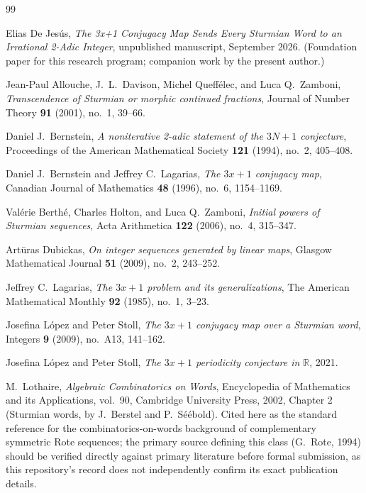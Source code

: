 \documentclass[11pt]{article}
\begin{document}
\begin{thebibliography}{99}

 Elias De Jesús, \emph{The 3x+1 Conjugacy Map Sends Every Sturmian Word to an Irrational 2-Adic Integer}, unpublished manuscript, September 2026. (Foundation paper for this research program; companion work by the present author.)

 Jean-Paul Allouche, J.\ L.\ Davison, Michel Queffélec, and Luca Q.\ Zamboni, \emph{Transcendence of Sturmian or morphic continued fractions}, Journal of Number Theory \textbf{91} (2001), no.\ 1, 39--66.

 Daniel J.\ Bernstein, \emph{A noniterative 2-adic statement of the $3N+1$ conjecture}, Proceedings of the American Mathematical Society \textbf{121} (1994), no.\ 2, 405--408.

 Daniel J.\ Bernstein and Jeffrey C.\ Lagarias, \emph{The $3x+1$ conjugacy map}, Canadian Journal of Mathematics \textbf{48} (1996), no.\ 6, 1154--1169.

 Valérie Berthé, Charles Holton, and Luca Q.\ Zamboni, \emph{Initial powers of Sturmian sequences}, Acta Arithmetica \textbf{122} (2006), no.\ 4, 315--347.

 Artūras Dubickas, \emph{On integer sequences generated by linear maps}, Glasgow Mathematical Journal \textbf{51} (2009), no.\ 2, 243--252.

 Jeffrey C.\ Lagarias, \emph{The $3x+1$ problem and its generalizations}, The American Mathematical Monthly \textbf{92} (1985), no.\ 1, 3--23.

 Josefina López and Peter Stoll, \emph{The $3x+1$ conjugacy map over a Sturmian word}, Integers \textbf{9} (2009), no.\ A13, 141--162.

 Josefina López and Peter Stoll, \emph{The $3x+1$ periodicity conjecture in $\mathbb{R}$}, 2021.

 M.\ Lothaire, \emph{Algebraic Combinatorics on Words}, Encyclopedia of Mathematics and its Applications, vol.\ 90, Cambridge University Press, 2002, Chapter 2 (Sturmian words, by J.\ Berstel and P.\ Séébold). Cited here as the standard reference for the combinatorics-on-words background of complementary symmetric Rote sequences; the primary source defining this class (G.\ Rote, 1994) should be verified directly against primary literature before formal submission, as this repository's record does not independently confirm its exact publication details.


\end{thebibliography}
\end{document}
